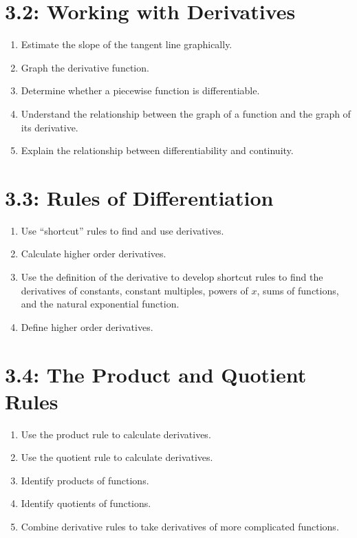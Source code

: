 \documentclass[11pt]{article}
\begin{document}
\section*{3.2: Working with Derivatives}
\begin{enumerate}
	\item Estimate the slope of the tangent line graphically.
	\item Graph the derivative function.
	\item Determine whether a piecewise function is differentiable.
	\item Understand the relationship between the graph of a function and the graph of its derivative.
	\item Explain the relationship between differentiability and continuity.
\end{enumerate}

\section*{3.3: Rules of Differentiation}
\begin{enumerate}
	\item Use ``shortcut'' rules to find and use derivatives.
	\item Calculate higher order derivatives.
	\item Use the definition of the derivative to develop shortcut rules to find the derivatives of constants, constant multiples, powers of $x$, sums of functions, and the natural exponential function.
	\item Define higher order derivatives.
\end{enumerate}


\section*{3.4: The Product and Quotient Rules}
\begin{enumerate}
	\item Use the product rule to calculate derivatives.
	\item Use the quotient rule to calculate derivatives.
	\item Identify products of functions.
	\item Identify quotients of functions.
	\item Combine derivative rules to take derivatives of more complicated functions.
\end{enumerate}
\end{document}

